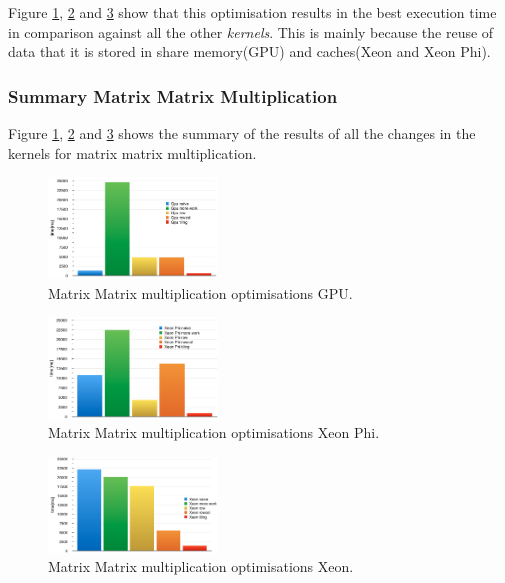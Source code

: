 \par{Figure \ref{gpu}, \ref{phi} and \ref{xeon} show that this optimisation 
    results in the best execution time in comparison against all the other
    \emph{kernels}. This is mainly because the reuse of data that it is stored
    in share memory(GPU) and caches(Xeon and Xeon Phi).}

\subsubsection{Summary Matrix Matrix Multiplication}

\par{Figure \ref{gpu}, \ref{phi} and \ref{xeon} shows the summary of the results of all the changes in the kernels for matrix
    matrix multiplication.}

\begin{figure}[!h]
    \centering
    \includegraphics[width=0.4\textwidth]{figures/gpu.png}
    \caption{Matrix Matrix multiplication optimisations GPU.}
    \label{gpu}
\end{figure}

\begin{figure}[!h]
    \centering
    \includegraphics[width=0.4\textwidth]{figures/phi.png}
    \caption{Matrix Matrix multiplication optimisations Xeon Phi.}
    \label{phi}
\end{figure}

\begin{figure}[!h]
    \centering
    \includegraphics[width=0.4\textwidth]{figures/xeon.png}
    \caption{Matrix Matrix multiplication optimisations Xeon.}
    \label{xeon}
\end{figure}

